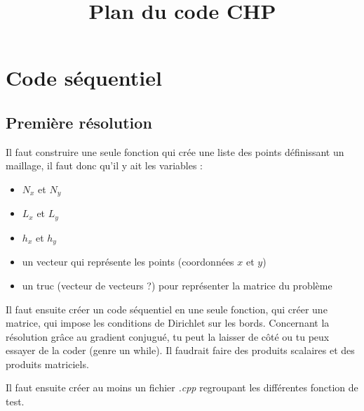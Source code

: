 \documentclass[french]{article}
\begin{document}
\title{Plan du code CHP}
\maketitle
\tableofcontents

\section{Code séquentiel}
\subsection{Première résolution}
Il faut construire une seule fonction qui crée une liste des points définissant un maillage, il faut donc qu'il y ait les variables :
\begin{itemize}
	\item $N_x$ et $N_y$
	\item $L_x$ et $L_y$
	\item $h_x$ et $h_y$
	\item un vecteur qui représente les points (coordonnées $x$ et $y$)
	\item un truc (vecteur de vecteurs ?) pour représenter la matrice du problème
\end{itemize}

Il faut ensuite créer un code séquentiel en une seule fonction, qui créer une matrice, qui impose les conditions de Dirichlet sur les bords. Concernant la résolution grâce au gradient conjugué, tu peut la laisser de côté ou tu peux essayer de la coder (genre un while). Il faudrait faire des produits scalaires et des produits matriciels.\newline

Il faut ensuite créer au moins un fichier \textit{.cpp} regroupant les différentes fonction de test. \newline
\end{document}
